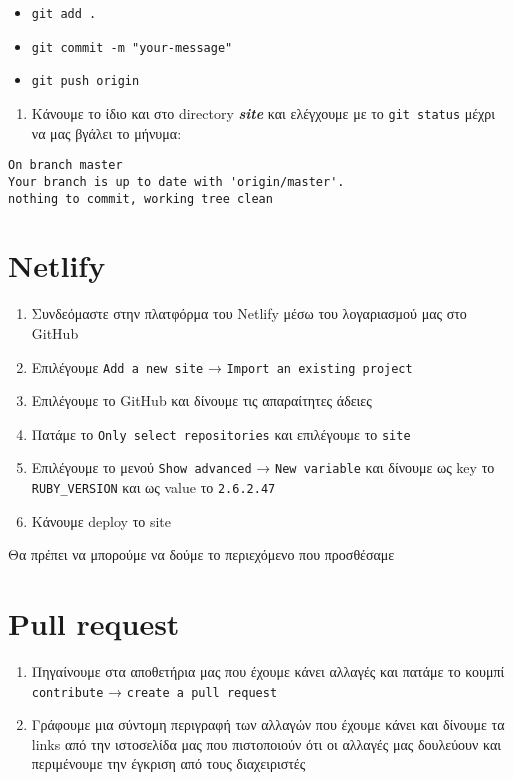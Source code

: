 \documentclass[
]{article}
\begin{document}
\begin{itemize}
\item
  \texttt{git~add~.}
\item
  \texttt{git~commit~-m~"your-message"}
\item
  \texttt{git~push~origin}
\end{itemize}

\begin{enumerate}
\item
  Κάνουμε το ίδιο και στο directory \textbf{\emph{site}} και ελέγχουμε
  με το \texttt{git~status} μέχρι να μας βγάλει το μήνυμα:
\end{enumerate}

\begin{verbatim}
On branch master
Your branch is up to date with 'origin/master'.
nothing to commit, working tree clean
\end{verbatim}

\hypertarget{netlify}{%
\section{Netlify}\label{netlify}}

\begin{enumerate}
\item
  Συνδεόμαστε στην πλατφόρμα του Netlify μέσω του λογαριασμού μας στο
  GitHub
\item
  Επιλέγουμε \texttt{Add~a~new~site} →
  \texttt{Import~an~existing~project}
\item
  Επιλέγουμε το GitHub και δίνουμε τις απαραίτητες άδειες
\item
  Πατάμε το \texttt{Only~select~repositories} και επιλέγουμε το
  \texttt{site}
\item
  Επιλέγουμε το μενού \texttt{Show~advanced} → \texttt{New~variable} και
  δίνουμε ως key το \texttt{RUBY\_VERSION} και ως value το
  \texttt{2.6.2.47}
\item
  Κάνουμε deploy το site
\end{enumerate}

Θα πρέπει να μπορούμε να δούμε το περιεχόμενο που προσθέσαμε

\hypertarget{pull-request}{%
\section{Pull request}\label{pull-request}}

\begin{enumerate}
\item
  Πηγαίνουμε στα αποθετήρια μας που έχουμε κάνει αλλαγές και πατάμε το
  κουμπί \texttt{contribute} → \texttt{create~a~pull~request}
\item
  Γράφουμε μια σύντομη περιγραφή των αλλαγών που έχουμε κάνει και
  δίνουμε τα links από την ιστοσελίδα μας που πιστοποιούν ότι οι αλλαγές
  μας δουλεύουν και περιμένουμε την έγκριση από τους διαχειριστές
\end{enumerate}
\end{document}
